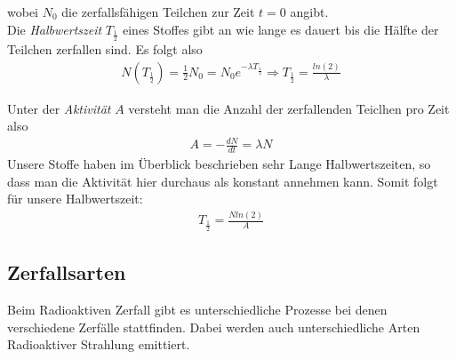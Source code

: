 \documentclass[12pt]{article}
\begin{document}
wobei $N_0$ die zerfallsfähigen Teilchen zur Zeit $t=0$ angibt.\\
Die \textit{Halbwertszeit} $T_{\frac{1}{2}}$ eines Stoffes gibt an wie lange es dauert bis die Hälfte der Teilchen zerfallen sind. Es folgt also
\begin{align}
N(T_{\frac{1}{2}}) = \frac{1}{2} N_0 = N_0 e^{ -\lambda T_{\frac{1}{2}}} \Rightarrow T_{\frac{1}{2}} = \frac{ln(2)}{\lambda}
\end{align}

Unter der \textit{Aktivität} $A$ versteht man die Anzahl der zerfallenden Teiclhen pro Zeit also 
\begin{align}
 \label{Aktivität} A = -\frac{dN}{dt} = \lambda N
\end{align}
Unsere Stoffe haben im Überblick beschrieben sehr Lange Halbwertszeiten, so dass man die Aktivität hier durchaus als konstant annehmen kann. Somit folgt für unsere Halbwertszeit:
\begin{align}
 \label{Halbzeit} T_{\frac{1}{2}} = \frac{N ln(2)}{A}
\end{align}

\subsection{Zerfallsarten}

Beim Radioaktiven Zerfall gibt es unterschiedliche Prozesse bei denen verschiedene Zerfälle stattfinden. Dabei werden auch unterschiedliche Arten Radioaktiver Strahlung emittiert.
\end{document}
